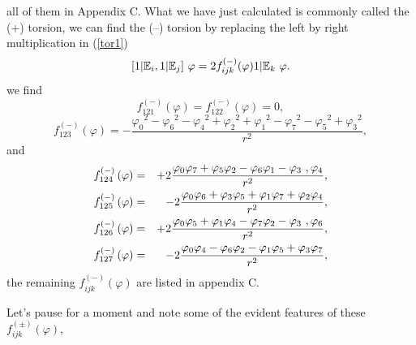 \documentclass[a4paper,12pt]{book}
\begin{document}
all of them in Appendix C. What we have just calculated is commonly called
the (+) torsion\cite{rom}, we can find the (--) torsion by replacing the
left by right multiplication in (\ref{tor1}) 
\begin{equation}
\lbrack 1|\Bbb{E}_{i},1|\Bbb{E}_{j}]{\ \varphi }=2f_{ijk}^{(-)}(\varphi )1|%
\Bbb{E}_{k}{\ \varphi }.
\end{equation}
we find 
\begin{equation}
f_{121}^{(-)}\left( \varphi \right) =f_{122}^{(-)}\left( \varphi \right) =0,
\end{equation}
\[
f_{123}^{(-)}\left( \varphi \right) =-{\frac{{\varphi _{0}}^{2}-{\varphi _{6}%
}^{2}-{\varphi _{4}}^{2}+{\varphi _{2}}^{2}+{\varphi _{1}}^{2}-{\varphi _{7}}%
^{2}-{\varphi _{5}}^{2}+{\varphi _{3}}^{2}}{r^{2}},} 
\]
and 
\begin{eqnarray}
f_{124}^{(-)}\left( \varphi \right) &=&+2{\frac{{\varphi _{0}}{\varphi _{7}}+%
{\varphi _{5}}{\varphi _{2}}-{\varphi _{6}}{\varphi _{1}}-{\varphi _{3}}\ ,{%
\varphi _{4}}}{r^{2}},} \\
f_{125}^{(-)}\left( \varphi \right) &=&-2{\frac{{\varphi _{0}}{\varphi _{6}}+%
{\varphi _{3}}{\varphi _{5}}+{\varphi _{1}}{\varphi _{7}}+{\varphi _{2}}{%
\varphi _{4}}}{r^{2}},} \\
f_{126}^{(-)}\left( \varphi \right) &=&+2{\frac{{\varphi _{0}}{\varphi _{5}}+%
{\varphi _{1}}{\varphi _{4}}-{\varphi _{7}}{\varphi _{2}}-{\varphi _{3}}\ ,{%
\varphi _{6}}}{r^{2}},} \\
f_{127}^{(-)}\left( \varphi \right) &=&-2{\frac{{\varphi _{0}}{\varphi _{4}}-%
{\varphi _{6}}{\varphi _{2}}-{\varphi _{1}}{\varphi _{5}}+{\varphi _{3}}{%
\varphi _{7}}}{r^{2}},}
\end{eqnarray}
the remaining $f_{ijk}^{(-)}\left( \varphi \right) $ are listed in appendix
C.

Let's pause for a moment and note some of the evident features of these $%
f_{ijk}^{\left( \pm \right) }(\varphi )$,
\end{document}
